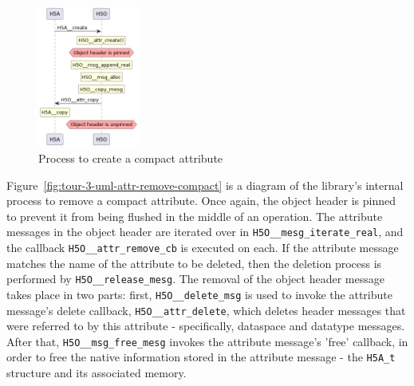 \begin{figure}
    \centering
    \includegraphics[width=0.30\textwidth]{images/tour_3_uml_attr_create_compact.png}
    \caption{Process to create a compact attribute}
    \label{fig:tour-3-uml-attr-create-compact}
\end{figure}

Figure~\ref{fig:tour-3-uml-attr-remove-compact} is a diagram of the library's internal process to remove a compact attribute. Once again, the object header is pinned to prevent it from being flushed in the middle of an operation. The attribute messages in the object header are iterated over in \texttt{H5O\_\_mesg\_iterate\_real}, and the callback \texttt{H5O\_\_attr\_remove\_cb} is executed on each. If the attribute message matches the name of the attribute to be deleted, then the deletion process is performed by \texttt{H5O\_\_release\_mesg}. The removal of the object header message takes place in two parts: first, \texttt{H5O\_\_delete\_msg} is used to invoke the attribute message's delete callback, \texttt{H5O\_\_attr\_delete}, which deletes header messages that were referred to by this attribute - specifically, dataspace and datatype messages. After that, \texttt{H5O\_\_msg\_free\_mesg} invokes the attribute message's 'free' callback, in order to free the native information stored in the attribute message - the \texttt{H5A\_t} structure and its associated memory.

